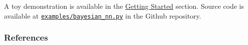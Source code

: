 A toy demonstration is available in the \href{/getting-started}{Getting Started} section.
Source code is available at
\href{https://github.com/blei-lab/edward/blob/master/examples/bayesian_nn.py}
{\texttt{examples/bayesian_nn.py}} in the Github repository.

\subsubsection{References}\label{references}
